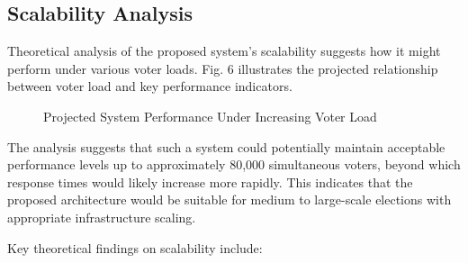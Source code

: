 \documentclass[conference]{IEEEtran}
\begin{document}
\subsection{Scalability Analysis}
Theoretical analysis of the proposed system's scalability suggests how it might perform under various voter loads. Fig. 6 illustrates the projected relationship between voter load and key performance indicators.

\begin{figure}[!h]
\centering
{}
\caption{Projected System Performance Under Increasing Voter Load}
\label{fig:scalability}
\end{figure}

The analysis suggests that such a system could potentially maintain acceptable performance levels up to approximately 80,000 simultaneous voters, beyond which response times would likely increase more rapidly. This indicates that the proposed architecture would be suitable for medium to large-scale elections with appropriate infrastructure scaling.

Key theoretical findings on scalability include:
\end{document}

